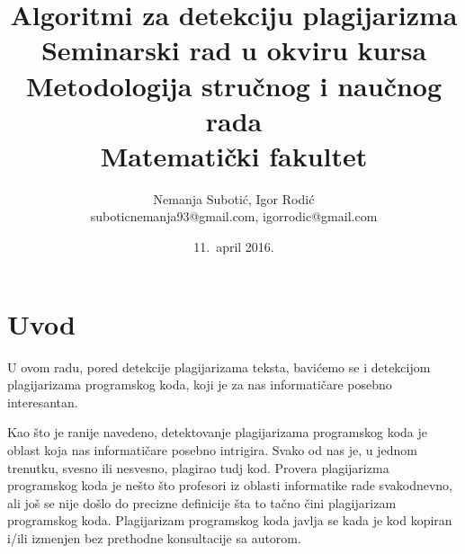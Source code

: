 \documentclass[a4paper]{article}
\begin{document}
\title{Algoritmi za detekciju plagijarizma \\ \small{Seminarski rad u okviru kursa\\Metodologija stručnog i naučnog rada\\ Matematički fakultet}}

\author{Nemanja Subotić, Igor Rodić \\ suboticnemanja93@gmail.com, igorrodic@gmail.com}
\date{11.~april 2016.}
\maketitle


\tableofcontents

\newpage

\section{Uvod}
\label{sec:uvod}

U ovom radu, pored detekcije plagijarizama teksta, bavićemo se i  detekcijom plagijarizama programskog koda, koji je za nas informatičare posebno interesantan.
\par Kao što je ranije navedeno, detektovanje plagijarizama programskog koda je oblast koja nas informatičare posebno intrigira. Svako od nas je, u jednom trenutku, svesno ili nesvesno, plagirao tudj kod. Provera plagijarizma programskog koda je nešto što profesori iz oblasti informatike rade svakodnevno, ali još se nije došlo do precizne definicije šta to tačno čini plagijarizam programskog koda. \cite{cosma} Plagijarizam programskog koda javlja se kada je kod kopiran i/ili izmenjen bez prethodne konsultacije sa autorom. \cite{culwinmacleodlancaster}
\end{document}
